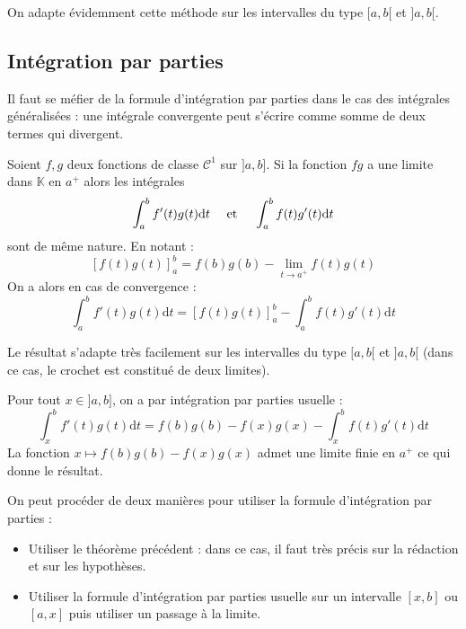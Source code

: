 \documentclass[french,11pt,twoside]{VcCours}
\newcommand{\dt}{\text{d}t}
\begin{document}
On adapte évidemment cette méthode sur les intervalles du type $[a,b[$ et $]a,b[$.
\subsection{Intégration par parties}

Il faut se méfier de la formule d'intégration par parties dans le cas des intégrales généralisées : une intégrale convergente peut s'écrire comme somme de deux termes qui divergent.

\begin{Theoreme}{} Soient $f,g$ deux fonctions de classe $\mathcal{C}^1$ sur $]a,b]$. Si la fonction $fg$ a une limite dans $\mathbb{K}$ en $a^+$ alors les intégrales 
$$ \int_{a}^{b} f'(t) g(t) \dt \quad \hbox{ et } \quad \int_{a}^{b} f(t) g'(t) \dt $$
sont de même nature. En notant :
$$ [f(t) g(t)]_{a}^{b} = f(b)g(b) - \lim_{t \rightarrow a^+} f(t)g(t)$$
On a alors en cas de convergence :
$$  \int_{a}^{b} f'(t) g(t) \dt = [f(t) g(t)]_{a}^{b} - \int_{a}^b f(t) g'(t) \dt$$
\end{Theoreme}

\begin{Remarque}{} Le résultat s'adapte très facilement sur les intervalles du type $[a,b[$ et $]a,b[$ (dans ce cas, le crochet est constitué de deux limites).
\end{Remarque}

\begin{Demonstration}{} Pour tout $x \in ]a,b]$, on a par intégration par parties \og usuelle \fg :
$$ \int_{x}^{b} f'(t) g(t) \dt = f(b)g(b)-f(x)g(x) - \int_{x}^b f(t) g'(t) \dt$$
La fonction $x \mapsto f(b)g(b)-f(x)g(x)$ admet une limite finie en $a^+$ ce qui donne le résultat.
\end{Demonstration}

\begin{Remarque}{} On peut procéder de deux manières pour utiliser la formule d'intégration par parties :

\begin{itemize}
\item Utiliser le théorème précédent : dans ce cas, il faut très précis sur la rédaction et sur les hypothèses.
\item Utiliser la formule d'intégration par parties usuelle sur un intervalle $[x,b]$ ou $[a,x]$ puis utiliser un passage à la limite.
\end{itemize}
\end{Remarque}
\end{document}
